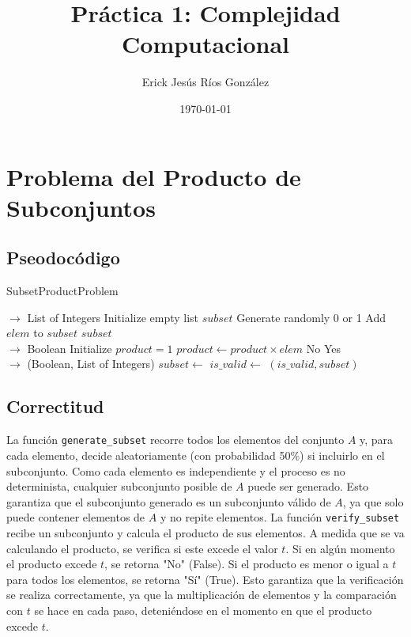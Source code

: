 \documentclass{article}
\title{Pr\'actica 1: Complejidad Computacional}
\author{Erick Jes\'us R\'ios Gonz\'alez}
\date{\today}
\begin{document}
\maketitle
\section{Problema del Producto de Subconjuntos}
\subsection{Pseodocódigo}
\begin{algorithm}
\caption{SubsetProductProblem}
\begin{algorithmic}[1]
 $\to$ List of Integers
    \State Initialize empty list $subset$
        \State Generate randomly 0 or 1
            \State Add $elem$ to $subset$
        \EndIf
    \EndFor
    \State \Return $subset$
\EndFunction
\\
 $\to$ Boolean
    \State Initialize $product = 1$
        \State $product \gets product \times elem$
            \State \Return No
        \EndIf
    \EndFor
    \State \Return Yes
\EndFunction
\\
 $\to$ (Boolean, List of Integers)
    \State $subset \gets$ 
    \State $is\_valid \gets$ 
    \State \Return $(is\_valid, subset)$
\EndFunction
\end{algorithmic}
\end{algorithm}
\subsection{Correctitud}

La función \texttt{generate\_subset} recorre todos los elementos del conjunto $A$ y, para cada elemento, decide aleatoriamente (con probabilidad 50\%) si incluirlo en el subconjunto. Como cada elemento es independiente y el proceso es no determinista, cualquier subconjunto posible de $A$ puede ser generado.
Esto garantiza que el subconjunto generado es un subconjunto válido de $A$, ya que solo puede contener elementos de $A$ y no repite elementos.
La función \texttt{verify\_subset} recibe un subconjunto y calcula el producto de sus elementos. A medida que se va calculando el producto, se verifica si este excede el valor $t$. Si en algún momento el producto excede $t$, se retorna "No" (False). Si el producto es menor o igual a $t$ para todos los elementos, se retorna "Sí" (True).
Esto garantiza que la verificación se realiza correctamente, ya que la multiplicación de elementos y la comparación con $t$ se hace en cada paso, deteniéndose en el momento en que el producto excede $t$.
\end{document}
